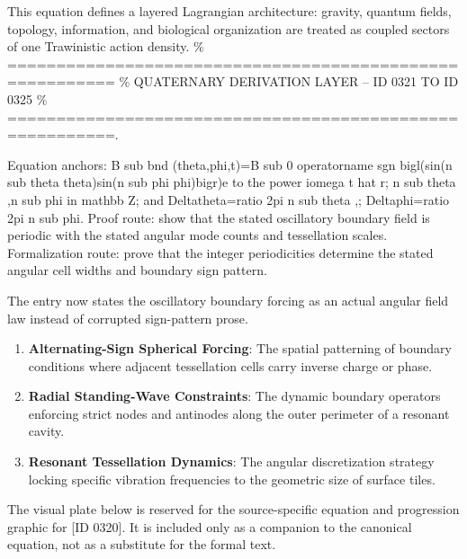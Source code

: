 This equation defines a layered Lagrangian architecture: gravity, quantum fields, topology, information, and biological organization are treated as coupled sectors of one Trawinistic action density. \% ========================================================= \% QUATERNARY DERIVATION LAYER -- ID 0321 TO ID 0325 \% =========================================================.

Equation anchors: B sub bnd (theta,phi,t)=B sub 0 operatorname sgn bigl(sin(n sub theta theta)sin(n sub phi phi)bigr)e to the power iomega t hat r; n sub theta ,n sub phi in mathbb Z; and Deltatheta=ratio 2pi n sub theta ,; Deltaphi=ratio 2pi n sub phi. Proof route: show that the stated oscillatory boundary field is periodic with the stated angular mode counts and tessellation scales. Formalization route: prove that the integer periodicities determine the stated angular cell widths and boundary sign pattern.

The entry now states the oscillatory boundary forcing as an actual angular field law instead of corrupted sign-pattern prose.
\endgroup

\begin{enumerate}[leftmargin=1.6em,itemsep=6pt,topsep=4pt]
\item \textbf{Alternating-Sign Spherical Forcing}: The spatial patterning of boundary conditions where adjacent tessellation cells carry inverse charge or phase.
\item \textbf{Radial Standing-Wave Constraints}: The dynamic boundary operators enforcing strict nodes and antinodes along the outer perimeter of a resonant cavity.
\item \textbf{Resonant Tessellation Dynamics}: The angular discretization strategy locking specific vibration frequencies to the geometric size of surface tiles.
\end{enumerate}

\begingroup\footnotesize\sloppy
The visual plate below is reserved for the source-specific equation and progression graphic for [ID 0320]. It is included only as a companion to the canonical equation, not as a substitute for the formal text.
\par\endgroup
\ifTZPDarkEdition
{}
\fi

